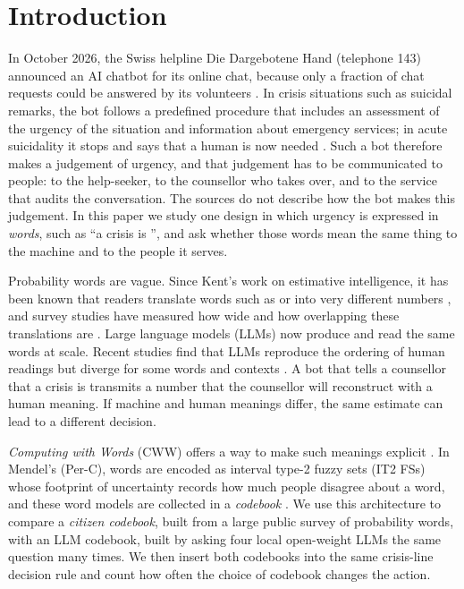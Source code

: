 \section{Introduction}
\label{sec:intro}

In October 2026, the Swiss helpline Die Dargebotene Hand (telephone 143) announced an AI chatbot for its online chat,
because only a fraction of chat requests could be answered by its volunteers \citep{srf2026dargebotene,keystone2026dargebotene}.
In crisis situations such as suicidal remarks, the bot follows a predefined procedure that includes an assessment of the
urgency of the situation and information about emergency services; in acute suicidality it stops and says that a human
is now needed \citep{keystone2026dargebotene,srf2026dargebotene}.
Such a bot therefore makes a judgement of urgency, and that judgement has to be communicated to people: to the
help-seeker, to the counsellor who takes over, and to the service that audits the conversation.
The sources do not describe how the bot makes this judgement.
In this paper we study one design in which urgency is expressed in \emph{words}, such as ``a crisis is
'', and ask whether those words mean the same thing to the machine and to the people it serves.

Probability words are vague.
Since Kent's work on estimative intelligence, it has been known that readers translate words such as  or
 into very different numbers \citep{kent1964words}, and survey studies have measured how wide and
how overlapping these translations are \citep{wallsten1986measuring,mosteller1990quantifying,budescu2014ipcc}.
Large language models (LLMs) now produce and read the same words at scale.
Recent studies find that LLMs reproduce the ordering of human readings but diverge for some words and contexts
\citep{belem2024perceptions,tang2026estimative,petridis2026unlikely}.
A bot that tells a counsellor that a crisis is  transmits a number that the counsellor will reconstruct with
a human meaning.
If machine and human meanings differ, the same estimate can lead to a different decision.

\emph{Computing with Words} (CWW) offers a way to make such meanings explicit \citep{zadeh1996fuzzy}.
In Mendel's \emph{\Perc{}} (Per-C), words are encoded as interval type-2 fuzzy sets (IT2 FSs) whose footprint of
uncertainty records how much people disagree about a word, and these word models are collected in a \emph{codebook}
\citep{mendel2001perceptual,mendel2010perceptual}.
We use this architecture to compare a \emph{citizen codebook}, built from a large public survey of probability words, with an
LLM codebook, built by asking four local open-weight LLMs the same question many times.
We then insert both codebooks into the same crisis-line decision rule and count how often the choice of codebook changes
the action.

